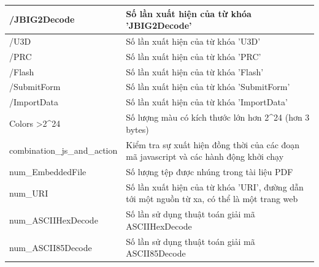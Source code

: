 \documentclass[./../main.tex]{subfiles}
\begin{document}
\begin{longtable}[c]{|p{}|p{}|}
	/JBIG2Decode                              & Số lần xuất hiện của từ khóa 'JBIG2Decode'                                                                                  \\ \hline
	/U3D                                      & Số lần xuất hiện của từ khóa 'U3D'                                                                                          \\ \hline
	/PRC                                      & Số lần xuất hiện của từ khóa 'PRC'                                                                                          \\ \hline
	/Flash                                    & Số lần xuất hiện của từ khóa 'Flash'                                                                                        \\ \hline
	/SubmitForm                               & Số lần xuất hiện của từ khóa 'SubmitForm'                                                                                   \\ \hline
	/ImportData                               & Số lần xuất hiện của từ khóa 'ImportData'                                                                                   \\ \hline
	Colors \textgreater 2\textasciicircum{}24 & Số lượng màu có kích thước lớn hơn 2\textasciicircum{}24 (hơn 3 bytes)                                                      \\ \hline
	combination\_js\_and\_action              & Kiểm tra sự xuất hiện đồng thời của các đoạn mã javascript và các hành động khởi chạy                                       \\ \hline
	num\_EmbeddedFile                         & Số lượng tệp được nhúng trong tài liệu PDF                                                                                  \\ \hline
	num\_URI                                  & Số lần xuất hiện của từ khóa 'URI', đường dẫn tới một nguồn từ xa, có thể là một trang web                                  \\ \hline
	num\_ASCIIHexDecode                       & Số lần sử dụng thuật toán giải mã ASCIIHexDecode                                                                            \\ \hline
	num\_ASCII85Decode                        & Số lần sử dụng thuật toán giải mã ASCII85Decode                                                                             \\ \hline

\end{longtable}
\end{document}
